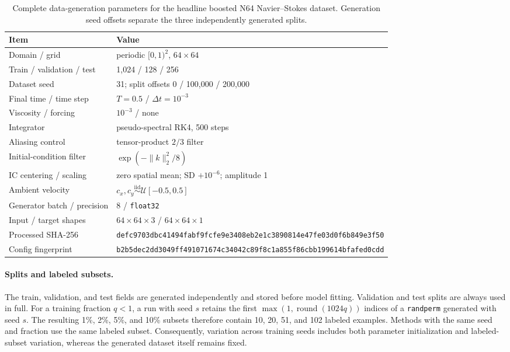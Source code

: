 \begin{table}[t]
\centering
\small
\caption{Complete data-generation parameters for the headline boosted N64
Navier--Stokes dataset.  Generation seed offsets separate the three independently
generated splits.}
\label{tab:n64-dataset-details}
\begin{tabular}{@{}lp{10.5cm}@{}}
\toprule
Item & Value \\
\midrule
Domain / grid & periodic \([0,1)^2\), \(64\times64\) \\
Train / validation / test & 1,024 / 128 / 256 \\
Dataset seed & 31; split offsets 0 / 100,000 / 200,000 \\
Final time / time step & \(T=0.5\) / \(\Delta t=10^{-3}\) \\
Viscosity / forcing & \(10^{-3}\) / none \\
Integrator & pseudo-spectral RK4, 500 steps \\
Aliasing control & tensor-product \(2/3\) filter \\
Initial-condition filter & \(\exp(-\lVert k\rVert_2^2/8)\) \\
IC centering / scaling & zero spatial mean; SD \(+10^{-6}\); amplitude 1 \\
Ambient velocity & \(c_x,c_y\stackrel{\mathrm{iid}}{\sim}\mathcal U[-0.5,0.5]\) \\
Generator batch / precision & 8 / \texttt{float32} \\
Input / target shapes & \(64\times64\times3\) / \(64\times64\times1\) \\
Processed SHA-256 & \texttt{defc9703dbc41494fabf9}\allowbreak\texttt{fcfe9e3408eb2e1c38908}\allowbreak\texttt{14e47fe03d0f6b849e3f50} \\
Config fingerprint & \texttt{b2b5dec2dd3049ff49107}\allowbreak\texttt{1674c34042c89f8c1a855}\allowbreak\texttt{f86cbb199614bfafed0cdd} \\
\bottomrule
\end{tabular}
\end{table}

\paragraph{Splits and labeled subsets.}
The train, validation, and test fields are generated independently and stored before
model fitting.  Validation and test splits are always used in full.  For a training
fraction \(q<1\), a run with seed \(s\) retains the first
\(\max(1,\operatorname{round}(1024q))\) indices of a \texttt{randperm} generated
with seed \(s\).  The resulting 1\%, 2\%, 5\%, and 10\% subsets therefore contain
10, 20, 51, and 102 labeled examples.  Methods with the same seed and fraction use
the same labeled subset.  Consequently, variation across training seeds includes
both parameter initialization and labeled-subset variation, whereas the generated
dataset itself remains fixed.


